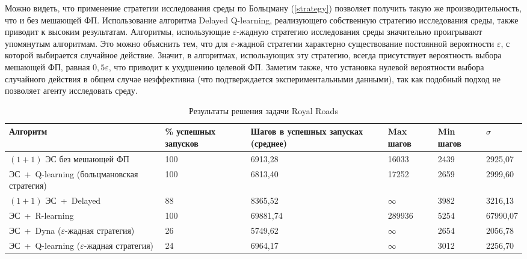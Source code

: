 Можно видеть, что применение стратегии исследования среды по Больцману (\ref{strategy}) позволяет получить такую же производительность, что и без мешающей ФП. Использование алгоритма Delayed Q-learning, реализующего собственную стратегию исследования среды, также приводит к высоким результатам. Алгоритмы, использующие $\varepsilon$-жадную стратегию исследования среды значительно проигрывают упомянутым алгоритмам. Это можно объяснить тем, что для $\varepsilon$-жадной стратегии характерно существование постоянной вероятности $\varepsilon$, с которой выбирается случайное действие. Значит, в алгоритмах, использующих эту стратегию, всегда присутствует вероятность выбора мешающей ФП, равная $0,5\varepsilon$, что приводит к ухудшению целевой ФП. Заметим также, что установка нулевой вероятности выбора случайного действия в общем случае неэффективна (что подтверждается экспериментальными данными), так как подобный подход не позволяет агенту исследовать среду.

\begin{table}[ht]
\begin{center}
\caption{Результаты решения задачи Royal Roads} \label{royal}
\begin{tabular}{|p{4cm}|p{2cm}|p{2.5cm}|l|l|l|}
\hline
Алгоритм &\% успешных запусков & Шагов в успешных запусках (среднее) & Max шагов & Min шагов & $\sigma$\\
\hline
$(1+1)$ ЭС без мешающей ФП &100 & 6913,28 & 16033 & 2439 & 2925,07 \\ \hline
ЭС~+~Q-learning \cite{sutton} (больцмановская стратегия) &100 & 6813,40 & 17252 & 2659 & 2999,60 \\ \hline
$(1+1)$ ЭС~+~Delayed \cite{delayed} &88 & 8365,52 & $\infty$ & 3982 & 3216,13 \\ \hline
ЭС~+~R-learning \cite{r-learning} &100 & 69881,74 & 289936 & 5254 & 67990,07 \\ \hline
ЭС~+~Dyna \cite{sutton} ($\varepsilon$-жадная стратегия) &26 & 5749,62 & $\infty$ & 2654 & 2056,78 \\ \hline
ЭС~+~Q-learning ($\varepsilon$-жадная стратегия) &24 & 6964,17 & $\infty$ & 3012 & 2256,70 \\ \hline
\end{tabular}
\end{center}
\end{table}

